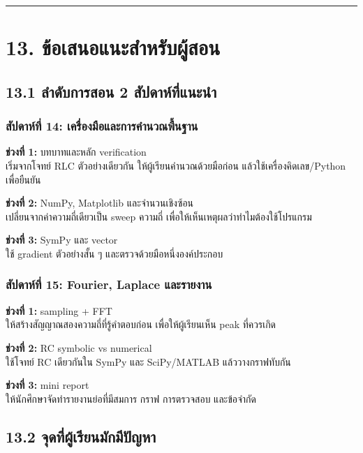 \par\noindent\rule{\textwidth}{0.4pt}\par

\section{13. ข้อเสนอแนะสำหรับผู้สอน}

\subsection{13.1 ลำดับการสอน 2 สัปดาห์ที่แนะนำ}

\subsubsection{สัปดาห์ที่ 14: เครื่องมือและการคำนวณพื้นฐาน}

\textbf{ช่วงที่ 1:} บทบาทและหลัก verification \\
เริ่มจากโจทย์ RLC ตัวอย่างเดียวกัน ให้ผู้เรียนคำนวณด้วยมือก่อน แล้วใช้เครื่องคิดเลข/Python เพื่อยืนยัน

\textbf{ช่วงที่ 2:} NumPy, Matplotlib และจำนวนเชิงซ้อน \\
เปลี่ยนจากค่าความถี่เดียวเป็น sweep ความถี่ เพื่อให้เห็นเหตุผลว่าทำไมต้องใช้โปรแกรม

\textbf{ช่วงที่ 3:} SymPy และ vector \\
ใช้ gradient ตัวอย่างสั้น ๆ และตรวจด้วยมือหนึ่งองค์ประกอบ

\subsubsection{สัปดาห์ที่ 15: Fourier, Laplace และรายงาน}

\textbf{ช่วงที่ 1:} sampling + FFT \\
ให้สร้างสัญญาณสองความถี่ที่รู้คำตอบก่อน เพื่อให้ผู้เรียนเห็น peak ที่ควรเกิด

\textbf{ช่วงที่ 2:} RC symbolic vs numerical \\
ใช้โจทย์ RC เดียวกันใน SymPy และ SciPy/MATLAB แล้ววางกราฟทับกัน

\textbf{ช่วงที่ 3:} mini report \\
ให้นักศึกษาจัดทำรายงานย่อที่มีสมการ กราฟ การตรวจสอบ และข้อจำกัด

\subsection{13.2 จุดที่ผู้เรียนมักมีปัญหา}

